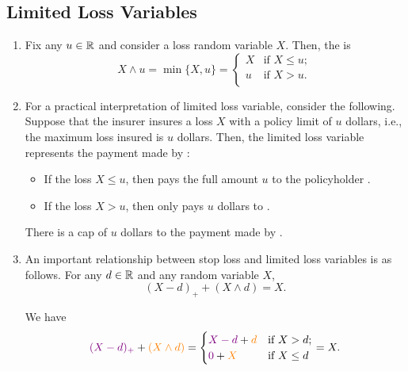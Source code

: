 \subsection{Limited Loss Variables}
\begin{enumerate}
\item Fix any \(u\in\mathbb{R}\) and consider a loss random variable \(X\). Then, the
 is
\[
X\wedge u=\min\{X,u\}=
\begin{cases}
X&\text{if }X\le u;\\
u&\text{if }X>u.\\
\end{cases}
\]
\item For a practical interpretation of limited loss variable, consider the
following. Suppose that the insurer  insures a loss \(X\)
with a policy limit of \(u\) dollars, i.e., the maximum loss insured is \(u\)
dollars. Then, the limited loss variable represents the payment made by
:
\begin{itemize}
\item If the loss \(X\le u\), then  pays the full amount \(u\) to
the policyholder .
\item If the loss \(X>u\), then  only pays \(u\) dollars to .
\end{itemize}
There is a cap of \(u\) dollars to the payment made by .

\item \label{it:sl-limloss-relation}
An important relationship between stop loss and limited loss variables is as
follows. For any \(d\in\mathbb{R}\) and any random variable \(X\),
\[
(X-d)_{+}+(X\wedge d)=X.
\]
\begin{pf}
We have
\[
{\color{violet}(X-d)_{+}}+{\color{orange}(X\wedge d)}
=\begin{cases}
{\color{violet}X-d}+{\color{orange}d}&\text{if }X>d;\\
{\color{violet}0}+{\color{orange}X}&\text{if }X\le d
\end{cases}
=X.
\]
\begin{center}
\end{center}
\end{pf}


\end{enumerate}
